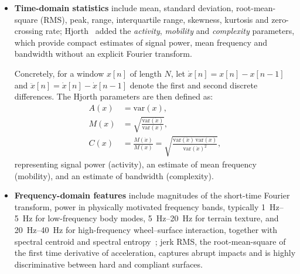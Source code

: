 \begin{itemize}
    \item \textbf{Time-domain statistics} include mean, standard deviation, root-mean-square (RMS), peak, range, interquartile range, skewness, kurtosis and zero-crossing rate; Hjorth~\cite{Hjorth1970} added the \emph{activity}, \emph{mobility} and \emph{complexity} parameters, which provide compact estimates of signal power, mean frequency and bandwidth without an explicit Fourier transform. 
    
    Concretely, for a window $x[n]$ of length $N$, let $\dot{x}[n] = x[n]-x[n-1]$ and $\ddot{x}[n] = \dot{x}[n]-\dot{x}[n-1]$ denote the first and second discrete differences. The Hjorth parameters are then defined as:
    \begin{align} A(x) &= \mathrm{var}(x), \label{eq:hjorth-activity} \\ M(x) &= \sqrt{\frac{\mathrm{var}(\dot{x})}{\mathrm{var}(x)}}, \label{eq:hjorth-mobility} \\ C(x) &= \frac{M(\dot{x})}{M(x)} = \sqrt{\frac{\mathrm{var}(\ddot{x})\,\mathrm{var}(x)}{\mathrm{var}(\dot{x})^{2}}}, \label{eq:hjorth-complexity}
    \end{align}
    representing signal power (activity), an estimate of mean frequency (mobility), and an estimate of bandwidth (complexity).

    \item \textbf{Frequency-domain features} include magnitudes of the short-time Fourier transform, power in physically motivated frequency bands, typically \SIrange{1}{5}{\hertz} for low-frequency body modes, \SIrange{5}{20}{\hertz} for terrain texture, and \SIrange{20}{40}{\hertz} for high-frequency wheel--surface interaction, together with spectral centroid and spectral entropy~\cite{Welch1967,Brooks2005}; jerk RMS, the root-mean-square of the first time derivative of acceleration, captures abrupt impacts and is highly discriminative between hard and compliant surfaces. 


\end{itemize}
